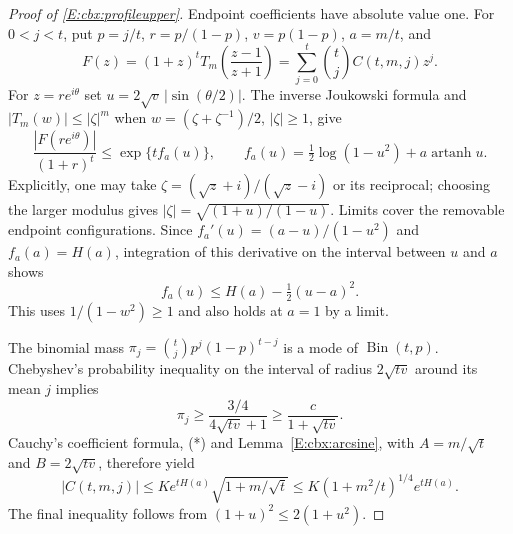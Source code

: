 \documentclass[11pt,a4paper]{article}
\theoremstyle{definition}
\theoremstyle{remark}
\numberwithin{equation}{section}
\begin{document}
\begin{proof}[Proof of \eqref{E:cbx:profileupper}]
Endpoint coefficients have absolute value one. For $0<j<t$, put
$p=j/t$, $r=p/(1-p)$, $v=p(1-p)$, $a=m/t$, and
\[
 F(z)=(1+z)^tT_m\left(\frac{z-1}{z+1}\right)
      =\sum_{j=0}^t\binom tjC(t,m,j)z^j.
\]
For $z=re^{i\theta}$ set $u=2\sqrt v\,|\sin(\theta/2)|$.
The inverse Joukowski formula and $|T_m(w)|\le|\zeta|^m$ when
$w=(\zeta+\zeta^{-1})/2$, $|\zeta|\ge1$, give
\[
 \frac{|F(re^{i\theta})|}{(1+r)^t}
 \le \exp\{t f_a(u)\},\qquad
 f_a(u)=\tfrac12\log(1-u^2)+a\operatorname{artanh}u.
\]
Explicitly, one may take
$\zeta=(\sqrt z+i)/(\sqrt z-i)$ or its reciprocal; choosing
the larger modulus gives $|\zeta|=\sqrt{(1+u)/(1-u)}$.
Limits cover the removable endpoint configurations. Since
$f_a'(u)=(a-u)/(1-u^2)$ and $f_a(a)=H(a)$,
integration of this derivative on the interval between $u$ and $a$
shows
\[
                 f_a(u)\le H(a)-\tfrac12(u-a)^2.             \tag{*}
\]
This uses $1/(1-w^2)\ge1$ and also holds at $a=1$ by a limit.

The binomial mass $\pi_j=\binom tjp^j(1-p)^{t-j}$ is a mode of
$\operatorname{Bin}(t,p)$. Chebyshev's probability inequality on
the interval of radius $2\sqrt{tv}$ around its mean $j$ implies
\[
 \pi_j\ge \frac{3/4}{4\sqrt{tv}+1}
                     \ge\frac{c}{1+\sqrt{tv}}.
\]
Cauchy's coefficient formula, (*) and Lemma~\ref{E:cbx:arcsine}, with
$A=m/\sqrt t$ and $B=2\sqrt{tv}$, therefore yield
\[
 |C(t,m,j)|\le K e^{tH(a)}\sqrt{1+m/\sqrt t}
      \le K(1+m^2/t)^{1/4}e^{tH(a)}.
\]
The final inequality follows from $(1+u)^2\le2(1+u^2)$.
\end{proof}
\end{document}
